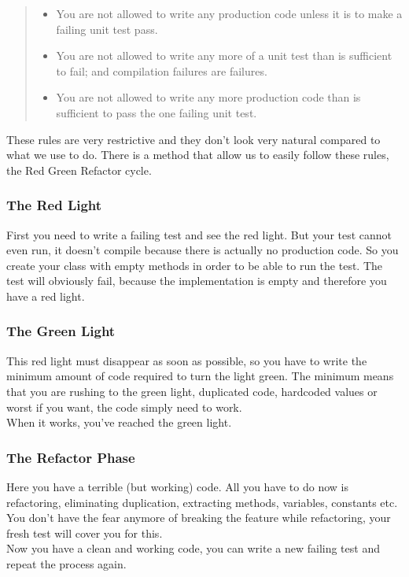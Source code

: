 \begin{quote}
    \begin{itemize}
        \item You are not allowed to write any production code unless it is to
        make a failing unit test pass.
        \item You are not allowed to write any more of a unit test than is
        sufficient to fail;
        and compilation failures are failures.
        \item You are not allowed to write any more production code than is
        sufficient
        to pass the one failing unit test.
    \end{itemize}
\end{quote}

These rules are very restrictive and they don't look very natural
compared to what we use to do.
There is a method that allow us to easily follow these rules, the
Red Green Refactor cycle.

\subsubsection{The Red Light}
First you need to write a failing test and see the red light.
But your test cannot even run, it doesn't compile because there is
actually no production code.
So you create your class with empty methods in order to be able to run
the test.
The test will obviously fail, because the implementation is empty and
therefore you have a red light.

\subsubsection{The Green Light}
This red light must disappear as soon as possible, so you have to write
the minimum amount of code required to turn the light green.
The minimum means that you are rushing to the green light, duplicated
code, hardcoded values or worst if you want, the code simply need to
work. \\
When it works, you've reached the green light.

\subsubsection{The Refactor Phase}
Here you have a terrible (but working) code.
All you have to do now is refactoring, eliminating duplication,
extracting methods, variables, constants etc.
You don't have the fear anymore of breaking the feature while
refactoring, your fresh test will cover you for this. \\
Now you have a clean and working code, you can write a new failing test
and repeat the process again.

